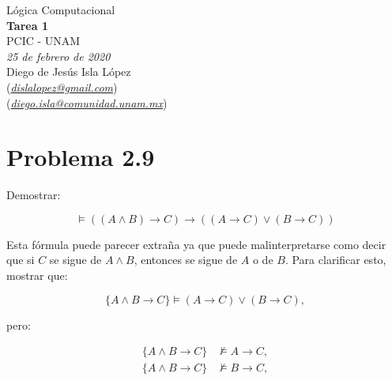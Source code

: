 \documentclass[letterpaper,12pt]{memoir}
\theoremstyle{definition}
\begin{document}
\begin{center}
  {\large Lógica Computacional}\\
  \vspace{0.2cm}
  {\large\bfseries Tarea 1}\\
  \vspace{0.2cm}
  {\large PCIC - UNAM}\\
  \vspace{0.5cm}
  {\itshape 25 de febrero de 2020}\\
  \vspace{0.5cm}
  Diego de Jesús Isla López\\
  (\href{mailto:dislalopez@gmail.com}{\itshape dislalopez@gmail.com})\\
  (\href{mailto:diego.isla@comunidad.unam.mx}{\itshape diego.isla@comunidad.unam.mx})\\
\end{center}


\section*{Problema 2.9}

Demostrar:

\begin{equation*}
  \models ((A \land B) \rightarrow C) \rightarrow ((A \rightarrow C) \lor (B \rightarrow C))  
\end{equation*}

Esta fórmula puede parecer extraña ya que puede malinterpretarse como decir que si \(C\) se sigue de \(A \land B\), entonces se sigue de \(A\) o de \(B\). Para clarificar esto, mostrar que:

\begin{equation*}
  \{A \land B \rightarrow C\}  \models (A \rightarrow C) \lor (B \rightarrow C),
\end{equation*}

pero:

\begin{align*}
  \{A \land B \rightarrow C\}  &\not\models A \rightarrow C, \\
  \{A \land B \rightarrow C\}  &\not\models B \rightarrow C,
\end{align*}
\end{document}
